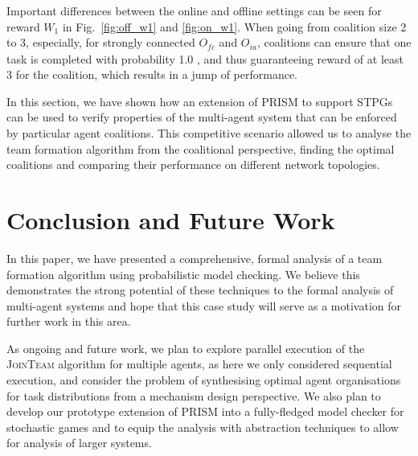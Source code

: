 \documentclass{llncs}
\begin{document}
Important differences between the online and offline settings can be seen for reward $W_1$ in Fig.~\ref{fig:off_w1} and \ref{fig:on_w1}. When going from coalition size 2 to 3, especially, for strongly connected $O_{\mathit{fc}}$ and $O_{ia}$, coalitions can ensure that one task is completed with probability 1.0
, and thus guaranteeing reward of at least 3 for the coalition, which results in a jump of performance.

In this section, we have shown how an extension of PRISM to support STPGs can be used to verify properties of the multi-agent system that can be enforced by particular agent coalitions. This competitive  scenario allowed us to analyse the team formation algorithm from the coalitional perspective, finding the optimal coalitions and comparing their performance on different network topologies.

\section{Conclusion and Future Work}
In this paper, we have presented a comprehensive, formal analysis of a team formation algorithm using probabilistic model checking. We believe this demonstrates the strong potential of these techniques to the formal analysis of multi-agent systems and hope that this case study will serve as a motivation for further work in this area.

As ongoing and future work,
we plan to explore parallel execution of the \textsc{JoinTeam} algorithm for multiple agents, as here we only considered sequential execution, and consider the problem of synthesising optimal agent organisations for task distributions from a mechanism design perspective.
We also plan to develop our prototype extension of PRISM
into a fully-fledged model checker for stochastic games
and to equip the analysis with abstraction techniques to allow for analysis of larger systems.

\end{document}
